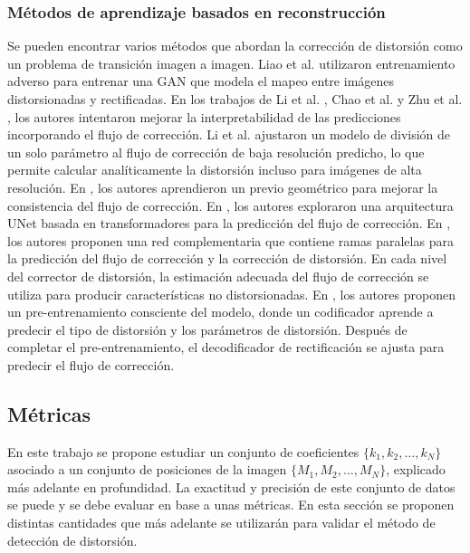 \documentclass[12pt]{article}
\numberwithin{equation}{section}%
\begin{document}
\subsubsection{Métodos de aprendizaje basados en reconstrucción}
Se pueden encontrar varios métodos que abordan la corrección de distorsión como un problema de transición imagen a imagen. Liao et al. \cite{liao2019dr} utilizaron entrenamiento adverso para entrenar una GAN que modela el mapeo entre imágenes distorsionadas y rectificadas. En los trabajos de Li et al. \cite{li2019blind}, Chao et al. \cite{chao2020self} y Zhu et al. \cite{zhu2022semi}, los autores intentaron mejorar la interpretabilidad de las predicciones incorporando el flujo de corrección. Li et al. \cite{li2019blind} ajustaron un modelo de división de un solo parámetro al flujo de corrección de baja resolución predicho, lo que permite calcular analíticamente la distorsión incluso para imágenes de alta resolución. En \cite{chao2020self}, los autores aprendieron un previo geométrico para mejorar la consistencia del flujo de corrección. En \cite{zhu2022semi}, los autores exploraron una arquitectura UNet basada en transformadores para la predicción del flujo de corrección. En \cite{yang2021progressively}, los autores proponen una red complementaria que contiene ramas paralelas para la predicción del flujo de corrección y la corrección de distorsión. En cada nivel del corrector de distorsión, la estimación adecuada del flujo de corrección se utiliza para producir características no distorsionadas. En \cite{wang2023model}, los autores proponen un pre-entrenamiento consciente del modelo, donde un codificador aprende a predecir el tipo de distorsión y los parámetros de distorsión. Después de completar el pre-entrenamiento, el decodificador de rectificación se ajusta para predecir el flujo de corrección.

\subsection{Métricas}
En este trabajo se propone estudiar un conjunto de coeficientes \(\{ k_1, k_2, \dots, k_N \}\) asociado a un conjunto de posiciones de la imagen \(\{ M_1, M_2, \dots, M_N \}\), explicado más adelante en profundidad. La exactitud y precisión de este conjunto de datos se puede y se debe evaluar en base a unas métricas. En esta sección se proponen distintas cantidades que más adelante se utilizarán para validar el método de detección de distorsión.\\
\end{document}
